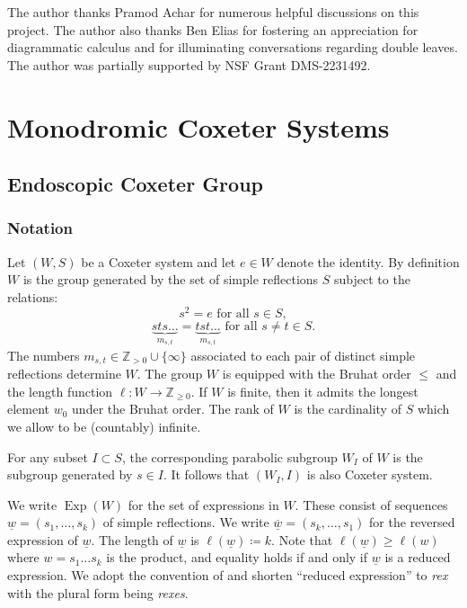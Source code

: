 \documentclass{amsart}
\newcommand{\Z}{\mathbb{Z}}
\DeclareMathOperator{\Exp}{Exp}
\newcommand{\uw}{\underline{w}}
\theoremstyle{definition}
\numberwithin{equation}{subsection}
\begin{document}
The author thanks Pramod Achar for numerous helpful discussions on this project.
The author also thanks Ben Elias for fostering an appreciation for diagrammatic calculus and for illuminating conversations regarding double leaves.
The author was partially supported by NSF Grant DMS-2231492.

    \section{Monodromic Coxeter Systems}\label{sec:coxeter}
\subsection{Endoscopic Coxeter Group}

\subsubsection{Notation}

Let $(W,S)$ be a Coxeter system and let $e \in W$ denote the identity.
By definition $W$ is the group generated by the set of simple reflections $S$ subject to the relations:
\begin{equation}
    s^2 = e \text{ for all } s \in S,
\end{equation}
\begin{equation}
    \underbrace{sts\ldots}_{m_{s,t}} = \underbrace{tst\ldots}_{m_{s,t}} \text{ for all } s\neq t \in S.
\end{equation}
The numbers $m_{s,t} \in \Z_{> 0} \cup \{\infty\}$ associated to each pair of distinct simple reflections determine $W$. 
The group $W$ is equipped with the Bruhat order $\leq$ and the length function $\ell : W \to \Z_{\geq 0}$.
If $W$ is finite, then it admits the longest element $w_0$ under the Bruhat order.
The rank of $W$ is the cardinality of $S$ which we allow to be (countably) infinite.

For any subset $I \subset S$, the corresponding parabolic subgroup $W_I$ of $W$ is the subgroup generated by $s \in I$.
It follows that $(W_I, I)$ is also Coxeter system.

We write $\Exp (W)$ for the set of expressions in $W$. These consist of sequences $\uw = (s_1, \ldots, s_k)$ of simple reflections.
We write $\overline{\uw} = (s_k, \ldots, s_1)$ for the reversed expression of $\uw$.
The length of $\uw$ is $\ell (\uw) \coloneq k$. Note that $\ell (\uw) \geq \ell (w)$ where $w=s_1 \ldots s_k$ is the product, and equality holds if and only if $\uw$ is a reduced expression.
We adopt the convention of \cite{EW} and shorten ``reduced expression'' to \emph{rex} with the plural form being \emph{rexes}. 
\end{document}
